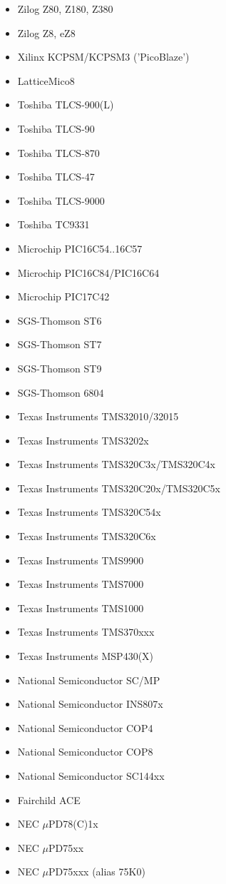\documentclass[12pt,a4paper,twoside]{report}
\begin{document}
\begin{itemize}
\item{Zilog Z80, Z180, Z380}
\item{Zilog Z8, eZ8}
\item{Xilinx KCPSM/KCPSM3 ('PicoBlaze')}
\item{LatticeMico8}
\item{Toshiba TLCS-900(L)}
\item{Toshiba TLCS-90}
\item{Toshiba TLCS-870}
\item{Toshiba TLCS-47}
\item{Toshiba TLCS-9000}
\item{Toshiba TC9331}
\item{Microchip PIC16C54..16C57}
\item{Microchip PIC16C84/PIC16C64}
\item{Microchip PIC17C42}
\item{SGS-Thomson ST6}
\item{SGS-Thomson ST7}
\item{SGS-Thomson ST9}
\item{SGS-Thomson 6804}
\item{Texas Instruments TMS32010/32015}
\item{Texas Instruments TMS3202x}
\item{Texas Instruments TMS320C3x/TMS320C4x}
\item{Texas Instruments TMS320C20x/TMS320C5x}
\item{Texas Instruments TMS320C54x}
\item{Texas Instruments TMS320C6x}
\item{Texas Instruments TMS9900}
\item{Texas Instruments TMS7000}
\item{Texas Instruments TMS1000}
\item{Texas Instruments TMS370xxx}
\item{Texas Instruments MSP430(X)}
\item{National Semiconductor SC/MP}
\item{National Semiconductor INS807x}
\item{National Semiconductor COP4}
\item{National Semiconductor COP8}
\item{National Semiconductor SC144xx}
\item{Fairchild ACE}
\item{NEC $\mu$PD78(C)1x}
\item{NEC $\mu$PD75xx}
\item{NEC $\mu$PD75xxx (alias 75K0)}

\end{itemize}
\end{document}
